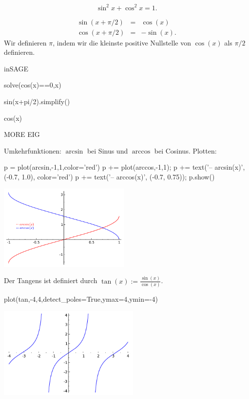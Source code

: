 \documentclass[fontsize=12pt,paper=a4,twoside,bibtotoc,idxtotoc,
liststotoc,pagesize,BCOR1.2cm,DIV15,chapterprefix,pagesize=pdftex]{scrbook}
\theoremstyle{plain}
\theoremstyle{definition}
\theoremstyle{remark}
\begin{document}
\[\sin^2x +\cos^2x=1.\]
 
\begin{eqnarray*}
\sin(x+\pi/2)&=&\cos(x)\\
 \cos(x+\pi/2)&=&-\sin(x).
\end{eqnarray*} 
 Wir definieren $\pi$, indem wir die kleinste positive Nullstelle
von $\cos(x)$ als $\pi/2$ definieren.



inSAGE

\begin{sagein}
solve(cos(x)==0,x)
\end{sagein}
\begin{sage}
[x == 1/2*pi]
\end{sage}
\begin{sagein}
sin(x+pi/2).simplify()
\end{sagein}
\begin{sage}
cos(x)
\end{sage}

MORE EIG


 Umkehrfunktionen: $\arcsin$ bei Sinus und $\arccos$ bei Cosinus.
Plotten: 
\begin{sagein}
p = plot(arcsin,-1,1,color='red')
p += plot(arccos,-1,1); 
p += text('-- arcsin(x)', (-0.7, 1.0), color='red')
p += text('-- arccos(x)', (-0.7, 0.75)); p.show()
\end{sagein}
\begin{center}
\includegraphics[width=6.5cm]{arcsinarccos.pdf}
\end{center}
 Der {\color{red} Tangens} ist definiert durch
$\tan(x) :=\frac{\sin(x)}{\cos(x)}$.
\begin{sagein}
plot(tan,-4,4,detect_poles=True,ymax=4,ymin=-4)
\end{sagein}
\begin{center}
\includegraphics[width=7cm]{tan.pdf}
\end{center}
\end{document}
